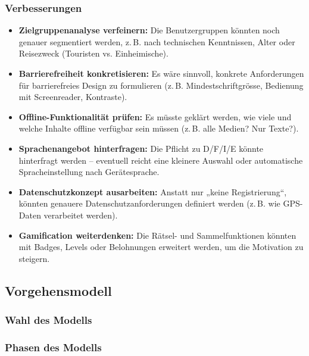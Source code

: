 \documentclass[10pt]{article}
\begin{document}
	\subsubsection[Verbesserungen]{Verbesserungen}
		\begin{itemize}
			\item \textbf{Zielgruppenanalyse verfeinern:} Die Benutzergruppen könnten noch genauer segmentiert werden, z.\,B. nach technischen Kenntnissen, Alter oder Reisezweck (Touristen vs. Einheimische).
			\item \textbf{Barrierefreiheit konkretisieren:} Es wäre sinnvoll, konkrete Anforderungen für barrierefreies Design zu formulieren (z.\,B. Mindestschriftgrösse, Bedienung mit Screenreader, Kontraste).
			\item \textbf{Offline-Funktionalität prüfen:} Es müsste geklärt werden, wie viele und welche Inhalte offline verfügbar sein müssen (z.\,B. alle Medien? Nur Texte?).
			\item \textbf{Sprachenangebot hinterfragen:} Die Pflicht zu D/F/I/E könnte hinterfragt werden – eventuell reicht eine kleinere Auswahl oder automatische Spracheinstellung nach Gerätesprache.
			\item \textbf{Datenschutzkonzept ausarbeiten:} Anstatt nur „keine Registrierung“, könnten genauere Datenschutzanforderungen definiert werden (z.\,B. wie GPS-Daten verarbeitet werden).
			\item \textbf{Gamification weiterdenken:} Die Rätsel- und Sammelfunktionen könnten mit Badges, Levels oder Belohnungen erweitert werden, um die Motivation zu steigern.
		\end{itemize}
		\pagebreak
	\subsection{Vorgehensmodell}
		\subsubsection{Wahl des Modells}
		
		\subsubsection{Phasen des Modells}
		
\end{document}
